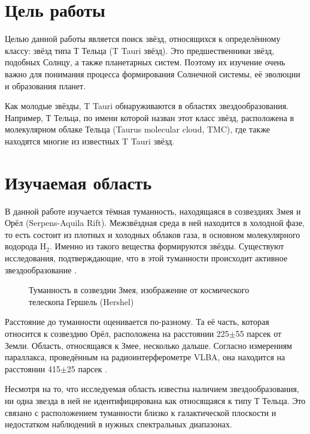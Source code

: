 

\section{Цель работы}
Целью данной работы является поиск звёзд, относящихся к определённому классу: звёзд типа Т Тельца (T Tauri звёзд). 
Это предшественники звёзд, подобных Солнцу, а также планетарных систем. Поэтому их изучение очень важно для понимания процесса формирования Солнечной системы, её эволюции и образования планет. 

Как молодые звёзды, T Tauri обнаруживаются в областях звездообразования. Например, Т Тельца, по имени которой назван этот класс звёзд, расположена в молекулярном облаке Тельца (Taurus molecular cloud, TMC), где также находятся многие из известных T Tauri звёзд.

\section{Изучаемая область}

В данной работе изучается тёмная туманность, находящаяся в созвездиях Змея и Орёл (Serpens-Aquila Rift). Межзвёздная среда в ней находится в холодной фазе, то есть состоит из плотных и холодных облаков газа, в основном молекулярного водорода H$_{2}$. Именно из такого вещества формируются звёзды. Существуют исследования, подтверждающие, что в этой туманности происходит активное звездообразование \cite{park2012far}.

\begin{figure}[ht]
\hfill
\caption{Туманность в созвездии Змея, изображение от космического телескопа Гершель (Hershel)}
\label{fig:area}
\end{figure}


Расстояние до туманности оценивается по-разному. Та её часть, которая относится к созвездию Орёл, расположена на расстоянии 225$\pm$55 парсек от Земли. Область, относящаяся к Змее, несколько дальше. Согласно измерениям параллакса, проведённым на радиоинтерферометре VLBA, она находится на расстоянии 415$\pm$25 парсек \cite{park2012far}.

Несмотря на то, что исследуемая область известна наличием звездообразования, ни одна звезда в ней не идентифицирована как относящаяся к типу Т Тельца. Это связано с расположением туманности близко к галактической плоскости и недостатком наблюдений в нужных спектральных диапазонах.

